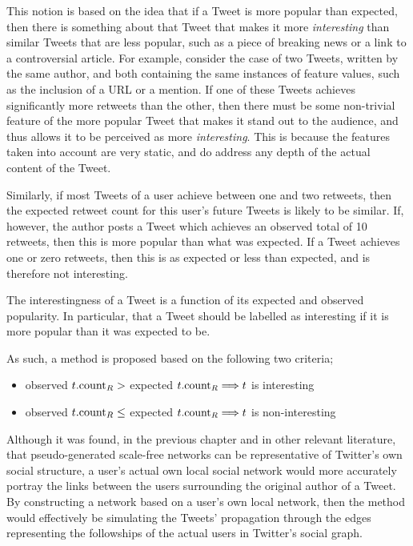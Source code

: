 This notion is based on the idea that if a Tweet is more popular than expected, then there is something about that Tweet that makes it more \textit{interesting} than similar Tweets that are less popular, such as a piece of breaking news or a link to a controversial article. For example, consider the case of two Tweets, written by the same author, and both containing the same instances of feature values, such as the inclusion of a URL or a mention. If one of these Tweets achieves significantly more retweets than the other, then there must be some non-trivial feature of the more popular Tweet that makes it stand out to the audience, and thus allows it to be perceived as more \textit{interesting}. This is because the features taken into account are very static, and do address any depth of the actual content of the Tweet.

Similarly, if most Tweets of a user achieve between one and two retweets, then the expected retweet count for this user's future Tweets is likely to be similar. If, however, the author posts a Tweet which achieves an observed total of 10 retweets, then this is more popular than what was expected. If a Tweet achieves one or zero retweets, then this is as expected or less than expected, and is therefore not interesting.

\begin{mytheorem}
\label{theorem:1}
The interestingness of a Tweet is a function of its expected and observed popularity. In particular, that a Tweet should be labelled as interesting if it is more popular than it was expected to be.
\end{mytheorem}

As such, a method is proposed based on the following two criteria;
\begin{itemize}
    \item observed $t.\textrm{count}_R >$ expected $t.\textrm{count}_R \Longrightarrow t$ is interesting
    \item observed $t.\textrm{count}_R \leq$ expected $t.\textrm{count}_R \Longrightarrow t$ is non-interesting
\end{itemize}

Although it was found, in the previous chapter and in other relevant literature, that pseudo-generated scale-free networks can be representative of Twitter's own social structure, a user's actual own local social network would more accurately portray the links between the users surrounding the original author of a Tweet. By constructing a network based on a user's own local network, then the method would effectively be simulating the Tweets' propagation through the edges representing the followships of the actual users in Twitter's social graph.


